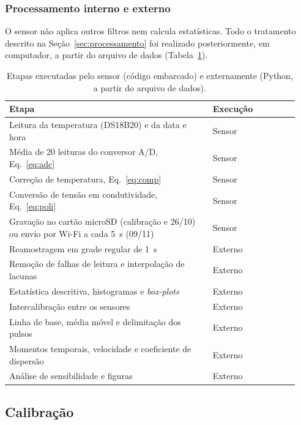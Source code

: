 \documentclass[12pt,a4paper]{article}
\begin{document}
\subsubsection{Processamento interno e externo}

O sensor não aplica outros filtros nem calcula estatísticas. Todo o tratamento descrito na Seção~\ref{sec:processamento} foi realizado posteriormente, em computador, a partir do arquivo de dados (Tabela~\ref{tab:interno_externo}).

\begin{table}[H]
  \centering
  \caption{Etapas executadas pelo sensor (código embarcado) e externamente (Python, a partir do arquivo de dados).}
  \label{tab:interno_externo}
  \begin{tabular}{@{}p{0.66\linewidth}p{0.28\linewidth}@{}}
    \toprule
    Etapa & Execução \\
    \midrule
    Leitura da temperatura (DS18B20) e da data e hora & Sensor \\
    Média de 20 leituras do conversor A/D, Eq.~\eqref{eq:adc} & Sensor \\
    Correção de temperatura, Eq.~\eqref{eq:comp} & Sensor \\
    Conversão de tensão em condutividade, Eq.~\eqref{eq:poli} & Sensor \\
    Gravação no cartão microSD (calibração e 26/10) ou envio por Wi-Fi a cada 5~s (09/11) & Sensor \\
    \midrule
    Reamostragem em grade regular de 1~s & Externo \\
    Remoção de falhas de leitura e interpolação de lacunas & Externo \\
    Estatística descritiva, histogramas e \emph{box-plots} & Externo \\
    Intercalibração entre os sensores & Externo \\
    Linha de base, média móvel e delimitação dos pulsos & Externo \\
    Momentos temporais, velocidade e coeficiente de dispersão & Externo \\
    Análise de sensibilidade e figuras & Externo \\
    \bottomrule
  \end{tabular}
\end{table}

\subsection{Calibração}
\label{sec:met_calibracao}
\end{document}
